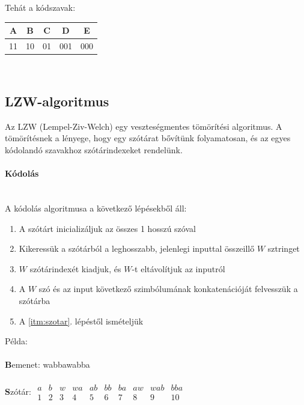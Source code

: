 \documentclass[margin=0px]{article}
\begin{document}
    \noindent Tehát a kódszavak:\\
			
	\begin{tabular}{|c|c|c||c|c|}
		\hline A & B & C & D & E \\
		\hline 11 & 10 & 01 & 001 & 000 \\
		\hline
	\end{tabular}\\
\newpage
    \subsection*{LZW-algoritmus}

    Az LZW (Lempel-Ziv-Welch) egy veszteségmentes tömörítési algoritmus. A tömörítésnek a lényege, hogy egy szótárat bővítünk folyamatosan, és az egyes kódolandó szavakhoz szótárindexeket rendelünk.

	\paragraph*{Kódolás\\\\}

    A kódolás algoritmusa a következő lépésekből áll:
	\begin{enumerate}
		\item A szótárt inicializáljuk az összes 1 hosszú szóval
		\item \label{itm:szotar} Kikeressük a szótárból a leghosszabb, jelenlegi inputtal összeillő $W$ sztringet
		\item $W$ szótárindexét kiadjuk, és $W$-t eltávolítjuk az inputról
		\item A $W$ szó és az input következő szimbólumának konkatenációját felvesszük a szótárba
		\item A \ref{itm:szotar}. lépéstől ismételjük
	\end{enumerate}

    \noindent Példa:\\\\
            \textbf{{\color{blue(pigment)}B}}emenet: wabbawabba\\\\
            \textbf{{\color{blue(pigment)}S}}zótár:
            $\begin{array}{|c|c|c||c|c|c|c|c|c|c|}
              a & b & w & wa & ab & bb & ba & aw & wab & bba\\ \hline
              1 & 2 & 3 & 4 & 5 & 6 & 7 & 8 & 9 & 10
            \end{array}$\\\\
\end{document}
